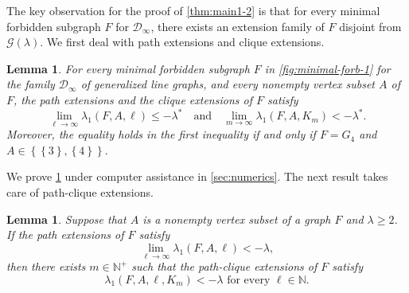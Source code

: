 \documentclass[11pt]{article}
\newtheorem{lemma}[theorem]{Lemma}
\theoremstyle{definition}
\theoremstyle{remark}
\newcommand{\sset}[1]{\left\{{#1}\right\}}
\newcommand{\la}{\lambda}
\newcommand{\D}{\mathcal{D}}
\newcommand{\G}{\mathcal{G}}
\newcommand{\N}{\mathbb{N}}
\newcommand{\Gl}{\G(\la)}
\begin{document}
The key observation for the proof of \cref{thm:main1-2} is that for every minimal forbidden subgraph $F$ for $\D_\infty$, there exists an extension family of $F$ disjoint from $\Gl$. We first deal with path extensions and clique extensions.

\begin{lemma} \label{lem:computation-1}
    For every minimal forbidden subgraph $F$ in \cref{fig:minimal-forb-1} for the family $\D_\infty$ of generalized line graphs, and every nonempty vertex subset $A$ of $F$, the path extensions and the clique extensions of $F$ satisfy
    \[
        \lim_{\ell\to\infty} \la_1(F, A, \ell) \le -\la^*
        \quad \text{and} \quad
        \lim_{m\to\infty} \la_1(F, A, K_m) < -\la^*.
    \]
    Moreover, the equality holds in the first inequality if and only if $F = G_4$ and $A \in \sset{\sset{3}, \sset{4}}$.
\end{lemma}

We prove \cref{lem:computation-1} under computer assistance in \cref{sec:numerics}. The next result takes care of path-clique extensions.

\begin{lemma} \label{lem:path-clique-extension}
    Suppose that $A$ is a nonempty vertex subset of a graph $F$ and $\la \ge 2$. If the path extensions of $F$ satisfy
    \[
        \lim_{\ell\to\infty} \la_1(F, A, \ell) < -\la,
    \]
    then there exists $m \in \N^+$ such that the path-clique extensions of $F$ satisfy
    \[
        \la_1(F, A, \ell, K_m) < -\la \text{ for every }\ell \in \N.
    \]
\end{lemma}
\end{document}
